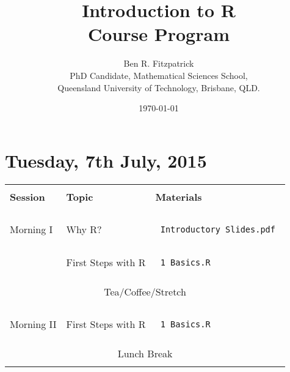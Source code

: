 \documentclass{article}[12pt]
\begin{document}
\title{\huge Introduction to R\\
\large Course Program}
\author{Ben R. Fitzpatrick\\ 
\small PhD Candidate, Mathematical Sciences School,\\
\small Queensland University of Technology, Brisbane, QLD.}
\date{\today}
\maketitle

\clearpage
\section*{Tuesday, 7th July, 2015}
\begin{table}[h!]
\begin{tabular}{ |p{2cm}|p{5cm}|p{6cm}| }
\hline
                               &                              & \\
\textbf{Session}               & \textbf{Topic}               & \textbf{Materials} \\ 
                               &                              & \\ \hline \hline
 & & \\
Morning I                      & Why R?                       & \begin{verbatim} Introductory_Slides.pdf \end{verbatim} \\
                               & First Steps with R           & \begin{verbatim} 1_Basics.R \end{verbatim} \\ \hline
\multicolumn{3}{c}{} \\
\multicolumn{3}{c}{Tea/Coffee/Stretch}  \\ 
\multicolumn{3}{c}{} \\\hline
 & & \\
Morning II                     & First Steps with R           & \begin{verbatim} 1_Basics.R \end{verbatim} \\ \hline
\multicolumn{3}{c}{} \\
\multicolumn{3}{c}{Lunch Break}  \\ 
\multicolumn{3}{c}{} \\\hline



\end{tabular}
\end{table}
\end{document}
